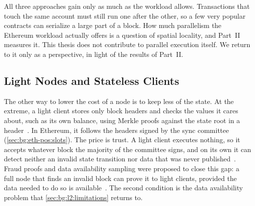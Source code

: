 All three approaches gain only as much as the workload allows.
Transactions that touch the same account must still run one after the other, so a few very popular contracts can serialize a large part of a block.
How much parallelism the Ethereum workload actually offers is a question of spatial locality, and Part~II measures it.
This thesis does not contribute to parallel execution itself.
We return to it only as a perspective, in light of the results of Part~II.

\subsection{Light Nodes and Stateless Clients}\label{sec:bg:workload:light}


The other way to lower the cost of a node is to keep less of the state.
At the extreme, a light client stores only block headers and checks the values it cares about, such as its own balance, using Merkle proofs against the state root in a header~\cite{chatzigiannis2022sok}.
In Ethereum, it follows the headers signed by the sync committee (\autoref{sec:bg:eth-pos:slots}).
The price is trust.
A light client executes nothing, so it accepts whatever block the majority of the committee signs, and on its own it can detect neither an invalid state transition nor data that was never published~\cite{chatzigiannis2022sok}.
Fraud proofs and data availability sampling were proposed to close this gap: a full node that finds an invalid block can prove it to light clients, provided the data needed to do so is available~\cite{albassam2021fraud}.
The second condition is the data availability problem that \autoref{sec:bg:l2:limitations} returns to.

